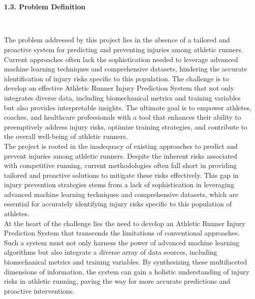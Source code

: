 \documentclass[12pt, English]{article}
\newcommand\tab[1][1cm]{\hspace*{#1}}
\begin{document}
\begin{normalsize}
\begin{normalsize}
\end{normalsize}
\\\\
\begin{large}
\textbf{1.3. Problem Definition}
\end{large}\\
\begin{normalsize}
\tab The problem addressed by this project lies in the absence of a tailored and proactive system for predicting and preventing injuries among athletic runners. Current approaches often lack the sophistication needed to leverage advanced machine learning techniques and comprehensive datasets, hindering the accurate identification of injury risks specific to this population. The challenge is to develop an effective Athletic Runner Injury Prediction System that not only integrates diverse data, including biomechanical metrics and training variables but also provides interpretable insights. The ultimate goal is to empower athletes, coaches, and healthcare professionals with a tool that enhances their ability to preemptively address injury risks, optimize training strategies, and contribute to the overall well-being of athletic runners.\\

\tab The project is rooted in the inadequacy of existing approaches to predict and prevent injuries among athletic runners. Despite the inherent risks associated with competitive running, current methodologies often fall short in providing tailored and proactive solutions to mitigate these risks effectively. This gap in injury prevention strategies stems from a lack of sophistication in leveraging advanced machine learning techniques and comprehensive datasets, which are essential for accurately identifying injury risks specific to this population of athletes.\\

\tab At the heart of the challenge lies the need to develop an Athletic Runner Injury Prediction System that transcends the limitations of conventional approaches. Such a system must not only harness the power of advanced machine learning algorithms but also integrate a diverse array of data sources, including biomechanical metrics and training variables. By synthesizing these multifaceted dimensions of information, the system can gain a holistic understanding of injury risks in athletic running, paving the way for more accurate predictions and proactive interventions.\\


\end{normalsize}
\end{normalsize}
\end{document}
